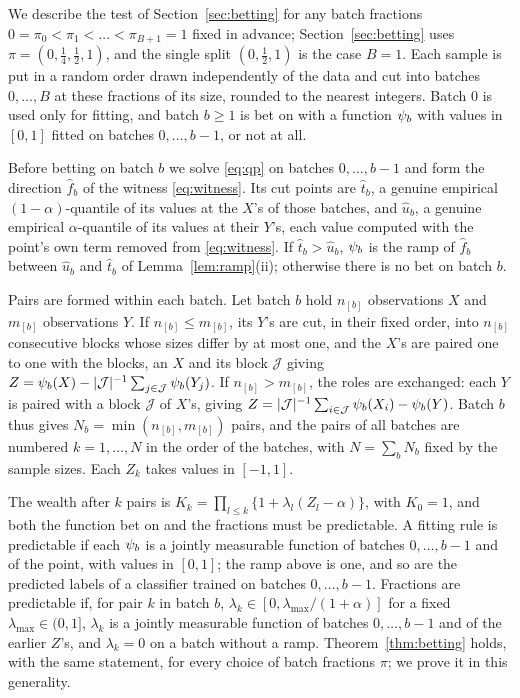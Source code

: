 We describe the test of Section~\ref{sec:betting} for any batch fractions $0=\pi_0<\pi_1<\dots<\pi_{B+1}=1$ fixed in advance;
Section~\ref{sec:betting} uses $\pi=(0,\tfrac14,\tfrac12,1)$, and the single split $(0,\tfrac12,1)$ is the case $B=1$. Each
sample is put in a random order drawn independently of the data and cut into batches $0,\dots,B$ at these fractions of
its size, rounded to the nearest integers. Batch $0$ is used
only for fitting, and batch $b\ge1$ is bet on with a function $\psi_b$ with values in $[0,1]$ fitted on batches
$0,\dots,b-1$, or not at all.

Before betting on batch $b$ we solve \eqref{eq:qp} on batches $0,\dots,b-1$ and form the direction
$\widehat f_b$ of the witness \eqref{eq:witness}. Its cut points are $\widehat t_b$, a genuine empirical
$(1-\alpha)$-quantile of its values at the $X$'s of those batches, and $\widehat u_b$, a genuine empirical
$\alpha$-quantile of its values at their $Y$'s, each value computed with the point's own term removed from
\eqref{eq:witness}. If $\widehat
t_b>\widehat u_b$, $\psi_b$ is the ramp of $\widehat f_b$ between $\widehat u_b$ and $\widehat t_b$ of
Lemma~\ref{lem:ramp}(ii); otherwise there is no bet on batch $b$.

Pairs are formed within each batch. Let batch $b$ hold $n_{[b]}$ observations $X$ and $m_{[b]}$ observations $Y$. If $n_{[b]}\le m_{[b]}$,
its $Y$'s are cut, in their fixed order, into $n_{[b]}$ consecutive blocks whose sizes differ by at most one, and the
$X$'s are paired one to one with the blocks, an $X$ and its block $\mathcal J$ giving
$Z=\psi_b(X)-|\mathcal J|^{-1}\sum_{j\in\mathcal J}\psi_b(Y_j)$. If $n_{[b]}>m_{[b]}$, the roles are exchanged: each $Y$ is
paired with a block $\mathcal J$ of $X$'s, giving $Z=|\mathcal J|^{-1}\sum_{i\in\mathcal J}\psi_b(X_i)-\psi_b(Y)$. Batch $b$
thus gives $N_b=\min(n_{[b]},m_{[b]})$ pairs, and the pairs of all batches are numbered $k=1,\dots,N$ in the order of the
batches, with $N=\sum_bN_b$ fixed by the sample sizes. Each $Z_k$ takes values in $[-1,1]$.

The wealth after $k$ pairs is $K_k=\prod_{l\le k}\{1+\lambda_l(Z_l-\alpha)\}$, with
$K_0=1$, and both the function bet on and the fractions must be predictable. A fitting rule is predictable if each $\psi_b$ is a jointly measurable function of batches $0,\dots,b-1$ and of the
point, with values in $[0,1]$; the ramp above is one, and so are the predicted labels of a classifier trained on batches
$0,\dots,b-1$. Fractions are predictable if, for pair $k$ in batch $b$, $\lambda_k\in[0,\lambda_{\max}/(1+\alpha)]$ for a
fixed $\lambda_{\max}\in(0,1]$, $\lambda_k$ is a jointly measurable function of batches $0,\dots,b-1$ and of the earlier
$Z$'s, and $\lambda_k=0$ on a batch without a ramp. Theorem~\ref{thm:betting} holds, with the same statement, for every
choice of batch fractions $\pi$; we prove it in this generality.

